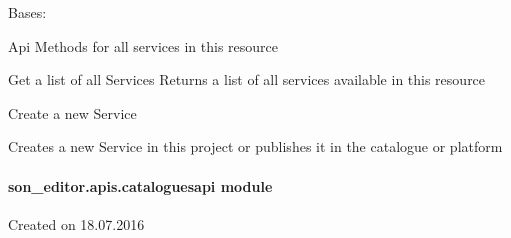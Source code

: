\documentclass[letterpaper,10pt,english]{sphinxmanual}
\begin{document}

\begin{fulllineitems}
\label{_source/son_editor.apis:son_editor.apis.catalogue_servicesapi.Services}
Bases: 

Api Methods for all services in this resource

\begin{fulllineitems}
\label{_source/son_editor.apis:son_editor.apis.catalogue_servicesapi.Services.get}
Get a list of all Services
Returns a list of all services available in this resource

\end{fulllineitems}


\begin{fulllineitems}
\label{_source/son_editor.apis:son_editor.apis.catalogue_servicesapi.Services.methods}
\end{fulllineitems}


\begin{fulllineitems}
\label{_source/son_editor.apis:son_editor.apis.catalogue_servicesapi.Services.post}
Create a new Service

Creates a new Service in this project or
publishes it in the catalogue or platform

\end{fulllineitems}


\end{fulllineitems}



\paragraph{son\_editor.apis.cataloguesapi module}
\label{_source/son_editor.apis:module-son_editor.apis.cataloguesapi}\label{_source/son_editor.apis:son-editor-apis-cataloguesapi-module}
Created on 18.07.2016
\end{document}

